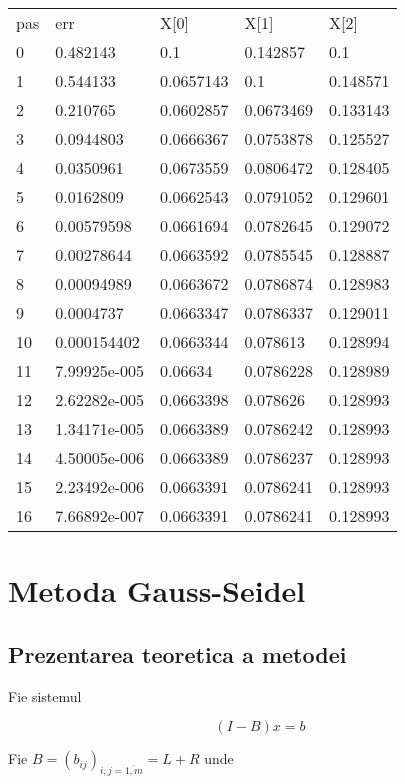\documentclass[a4paper,twoside]{book}
\begin{document}
\begin{tabular}{lllll}
pas & err & X[0] & X[1] & X[2] \\ 
0 & 0.482143 & 0.1 & 0.142857 & 0.1 \\ 
1 & 0.544133 & 0.0657143 & 0.1 & 0.148571 \\ 
2 & 0.210765 & 0.0602857 & 0.0673469 & 0.133143 \\ 
3 & 0.0944803 & 0.0666367 & 0.0753878 & 0.125527 \\ 
4 & 0.0350961 & 0.0673559 & 0.0806472 & 0.128405 \\ 
5 & 0.0162809 & 0.0662543 & 0.0791052 & 0.129601 \\ 
6 & 0.00579598 & 0.0661694 & 0.0782645 & 0.129072 \\ 
7 & 0.00278644 & 0.0663592 & 0.0785545 & 0.128887 \\ 
8 & 0.00094989 & 0.0663672 & 0.0786874 & 0.128983 \\ 
9 & 0.0004737 & 0.0663347 & 0.0786337 & 0.129011 \\ 
10 & 0.000154402 & 0.0663344 & 0.078613 & 0.128994 \\ 
11 & 7.99925e-005 & 0.06634 & 0.0786228 & 0.128989 \\ 
12 & 2.62282e-005 & 0.0663398 & 0.078626 & 0.128993 \\ 
13 & 1.34171e-005 & 0.0663389 & 0.0786242 & 0.128993 \\ 
14 & 4.50005e-006 & 0.0663389 & 0.0786237 & 0.128993 \\ 
15 & 2.23492e-006 & 0.0663391 & 0.0786241 & 0.128993 \\ 
16 & 7.66892e-007 & 0.0663391 & 0.0786241 & 0.128993%
\end{tabular}

\chapter{Metoda Gauss-Seidel}

\section{Prezentarea teoretica a metodei}

Fie sistemul

\begin{equation}
(I-B)x=b  \label{13}
\end{equation}

Fie $B=(b_{ij})_{i,j=\overline{1,m}}=L+R$ unde
\end{document}
